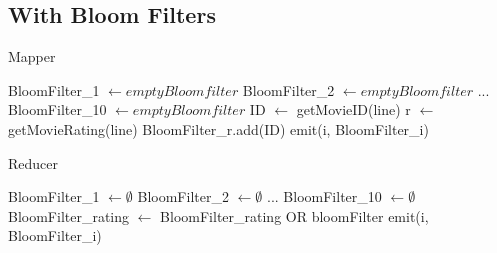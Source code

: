 \subsection{With Bloom Filters}

\begin{algorithm}
	\caption{Mapper} 
	\begin{algorithmic}[1]
			\State BloomFilter\_1 $\gets empty Bloom filter$
			\State BloomFilter\_2 $\gets empty Bloom filter$
			\State ...
			\State BloomFilter\_10 $\gets empty Bloom filter$	
				\State ID $\gets$ getMovieID(line)
				\State r $\gets$ getMovieRating(line)
				\State BloomFilter\_r.add(ID)
			\EndFor
				\State emit(i, BloomFilter\_i)
			\EndFor
		\EndProcedure
	\end{algorithmic} 
\end{algorithm}

\begin{algorithm}
	\caption{Reducer} 
	\begin{algorithmic}[1]
			\State BloomFilter\_1 $\gets \emptyset$
			\State BloomFilter\_2 $\gets \emptyset$
			\State ...
			\State BloomFilter\_10 $\gets \emptyset$	
				\State BloomFilter\_rating $\gets$ BloomFilter\_rating OR bloomFilter
			\EndFor
				\State emit(i, BloomFilter\_i)
			\EndFor
		\EndProcedure
	\end{algorithmic} 
\end{algorithm}

